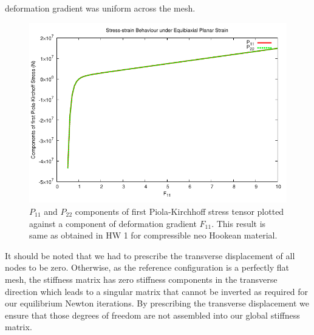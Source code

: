 \documentclass[../main.tex]{subfiles}
\begin{document}
deformation gradient was uniform across the mesh.
\begin{figure}[h]
  \centering
  \includegraphics[scale=0.75]{./img/EquiBiaxial.pdf}
  \caption{$P_{11}$ and $P_{22}$ components of first Piola-Kirchhoff
    stress tensor plotted against a component of deformation gradient
    $F_{11}$. This result is same as obtained in HW 1 for compressible
    neo Hookean material.}
  \label{fig:equiBiaxialStressStrain}
\end{figure}
It should be noted that we had to prescribe the transverse
displacement of all nodes to be zero. Otherwise, as the reference
configuration is a perfectly flat mesh, the stiffness matrix has zero
stiffness components in the transverse direction which leads to a
singular matrix that cannot be inverted as required for our
equilibrium Newton iterations. By prescribing the transverse
displacement we ensure that those degrees of freedom are not assembled
into our global stiffness matrix.
\end{document}
